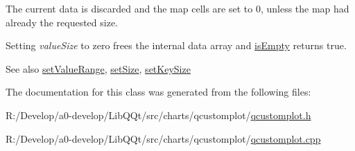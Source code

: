 The current data is discarded and the map cells are set to 0, unless the map had already the requested size.

Setting {\itshape value\+Size} to zero frees the internal data array and \mbox{\hyperlink{class_q_c_p_color_map_data_aea88cc75a76ca571acf29b2ba8ac970d}{is\+Empty}} returns true.

\begin{DoxySeeAlso}{See also}
\mbox{\hyperlink{class_q_c_p_color_map_data_ada1b2680ba96a5f4175b6d341cf75d23}{set\+Value\+Range}}, \mbox{\hyperlink{class_q_c_p_color_map_data_a0d9ff35c299d0478b682bfbcdd9c097e}{set\+Size}}, \mbox{\hyperlink{class_q_c_p_color_map_data_ac7ef70e383aface34b44dbde49234b6b}{set\+Key\+Size}} 
\end{DoxySeeAlso}


The documentation for this class was generated from the following files\+:\begin{DoxyCompactItemize}
\item 
R\+:/\+Develop/a0-\/develop/\+Lib\+Q\+Qt/src/charts/qcustomplot/\mbox{\hyperlink{qcustomplot_8h}{qcustomplot.\+h}}\item 
R\+:/\+Develop/a0-\/develop/\+Lib\+Q\+Qt/src/charts/qcustomplot/\mbox{\hyperlink{qcustomplot_8cpp}{qcustomplot.\+cpp}}\end{DoxyCompactItemize}
